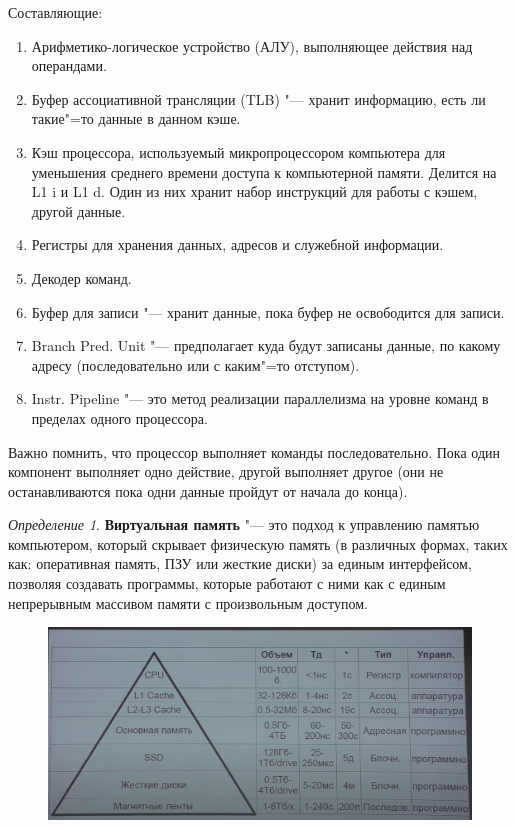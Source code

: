 \documentclass[bachelor, och, pract]{SCWorks}
\theoremstyle{remark}
\newtheorem{definition}{Определение}
\begin{document}
    Составляющие: 
    
    \begin{enumerate}
        \item Арифметико-логическое устройство (АЛУ), выполняющее действия над операндами.
        \item Буфер ассоциативной трансляции (TLB) "--- хранит информацию, есть ли такие"=то данные в данном кэше.
        \item Кэш процессора, используемый микропроцессором компьютера для уменьшения среднего времени доступа к компьютерной памяти. Делится на L1 i и L1 d. Один из них хранит набор инструкций для работы с кэшем, другой данные.
        \item Регистры для хранения данных, адресов и служебной информации.
        \item Декодер команд.
        \item Буфер для записи "--- хранит данные, пока буфер не освободится для записи.
        \item Branch Pred. Unit "--- предполагает куда будут записаны данные, по какому адресу (последовательно или с каким"=то отступом).
        \item Instr. Pipeline "--- это метод реализации параллелизма на уровне команд в пределах одного процессора.
    \end{enumerate}

    \hfill \break
    Важно помнить, что процессор выполняет команды последовательно. Пока один компонент выполняет одно действие, другой выполняет другое (они не останавливаются пока одни данные пройдут от начала до конца).

    \begin{definition}
        \textbf{Виртуальная память} "--- это подход к управлению памятью компьютером, который скрывает физическую память (в различных формах, таких как: оперативная память, ПЗУ или жесткие диски) за единым интерфейсом, позволяя создавать программы, которые работают с ними как с единым непрерывным массивом памяти с произвольным доступом.
    \end{definition}

    \begin{figure}[H]
        \begin{center}
            \includegraphics[scale=0.4]{res/memory-pyramid.png}
        \end{center}
    \end{figure}
\end{document}
